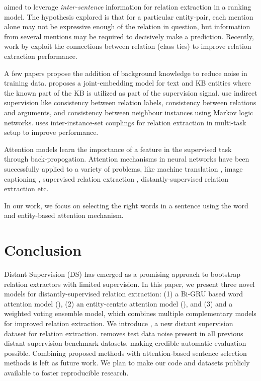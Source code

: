 \documentclass{article}
\begin{document}
  \cite{zheng:2016} aimed to leverage \textit{inter-sentence} information for relation extraction in a ranking model. The hypothesis explored is that for a particular entity-pair, each mention alone may not be expressive enough of the relation in question, but information from several mentions may be required to decisively make a prediction. Recently, work by \cite{DBLP:journals/corr/YeCL16} exploit the connections between relation (class ties) to improve relation extraction performance.

A few papers propose the addition of background knowledge to reduce noise in training data. \cite{weston:2013} proposes a joint-embedding model for text and KB entities where the known part of the KB is utilized as part of the supervision signal. \cite{han:2016} use indirect supervision like consistency between relation labels, consistency between relations and arguments, and consistency between neighbour instances using Markov logic networks. \cite{candis} uses inter-instance-set couplings for relation extraction in multi-task setup to improve performance.

 Attention models learn the importance of a feature in the supervised task through back-propogation. Attention mechanisms in neural networks have been successfully applied to a variety of problems, like machine translation \cite{bahdanau2014neural}, image captioning \cite{xu+al-2015-icml}, supervised relation extraction \cite{byshen:2016}, distantly-supervised relation extraction \cite{zheng:2016} etc. 

In our work, we focus on selecting the right words in a sentence using the word and entity-based attention mechanism. 
 \section{Conclusion}

Distant Supervision (DS) has emerged as a promising approach to bootstrap relation extractors with limited supervision. In this paper, we present three novel models for distantly-supervised relation extraction: (1) a Bi-GRU based word attention model (\systemwa{}), (2) an entity-centric attention model (\systemea{}), and (3) and a weighted voting ensemble model, which combines multiple complementary models for improved relation extraction. We introduce \newdatasetshort{}, a new distant supervision dataset for relation extraction. \newdatasetshort{} removes test data noise present in all previous distant supervision benchmark datasets, making credible automatic evaluation possible. Combining proposed methods with attention-based sentence selection methods is left as future work. We plan to make our code and datasets publicly available to foster reproducible research.

 





\end{document}
